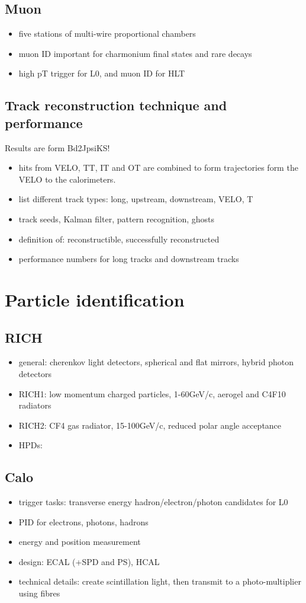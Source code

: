 \subsection{Muon}
\begin{itemize}
  \item five stations of multi-wire proportional chambers
  \item muon ID important for charmonium final states and rare decays
  \item high pT trigger for L0, and muon ID for HLT
\end{itemize}
\subsection{Track reconstruction technique and performance}
Results are form Bd2JpsiKS!
\begin{itemize}
  \item hits from VELO, TT, IT and OT are combined to form trajectories form the VELO to the calorimeters. 
  \item list different track types: long, upstream, downstream, VELO, T
  \item track seeds, Kalman filter, pattern recognition, ghosts
  \item definition of: reconstructible, successfully reconstructed
  \item performance numbers for long tracks and downstream tracks
\end{itemize}

\section{Particle identification}
\subsection{RICH}
\begin{itemize}
  \item general: cherenkov light detectors, spherical and flat mirrors, hybrid photon detectors
  \item RICH1: low momentum charged particles, 1-60GeV/c, aerogel and C4F10 radiators
  \item RICH2: CF4 gas radiator, 15-100GeV/c, reduced polar angle acceptance
  \item HPDs: 
\end{itemize}
\subsection{Calo}
\begin{itemize}
  \item trigger tasks: transverse energy hadron/electron/photon candidates for L0
  \item PID for electrons, photons, hadrons
  \item energy and position measurement
  \item design: ECAL (+SPD and PS), HCAL
  \item technical details: create scintillation light, then transmit to a photo-multiplier using fibres
\end{itemize}
